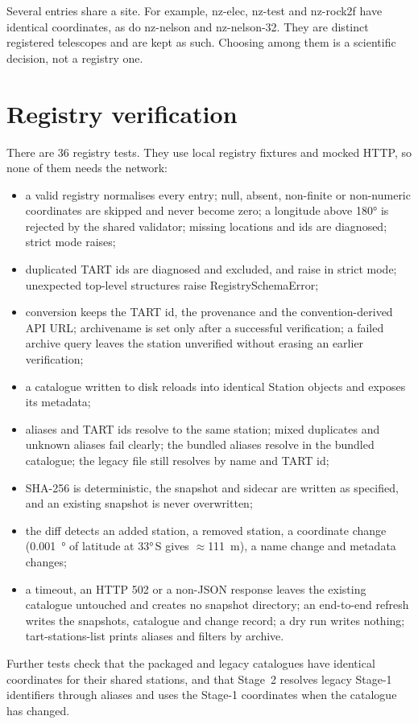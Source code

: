 \documentclass[11pt,a4paper]{article}
\newcommand{\code}[1]{{\ttfamily\def\_{\textunderscore\allowbreak}#1}}
\begin{document}
Several entries share a site. For example, \code{nz-elec}, \code{nz-test}
and \code{nz-rock2f} have identical coordinates, as do \code{nz-nelson} and
\code{nz-nelson-32}. They are distinct registered telescopes and are kept
as such. Choosing among them is a scientific decision, not a registry one.

\section{Registry verification}

There are 36 registry tests. They use local registry fixtures and mocked
HTTP, so none of them needs the network:
\begin{itemize}
\item a valid registry normalises every entry; \code{null}, absent,
non-finite or non-numeric coordinates are skipped and never become zero;
a longitude above \ang{180} is rejected by the shared validator; missing
locations and ids are diagnosed; strict mode raises;
\item duplicated TART ids are diagnosed and excluded, and raise in strict
mode; unexpected top-level structures raise \code{RegistrySchemaError};
\item conversion keeps the TART id, the provenance and the
convention-derived API URL; \code{archive\_name} is set only after a
successful verification; a failed archive query leaves the station
unverified without erasing an earlier verification;
\item a catalogue written to disk reloads into identical \code{Station}
objects and exposes its metadata;
\item aliases and TART ids resolve to the same station; mixed duplicates
and unknown aliases fail clearly; the bundled aliases resolve in the
bundled catalogue; the legacy file still resolves by name and TART id;
\item SHA-256 is deterministic, the snapshot and sidecar are written as
specified, and an existing snapshot is never overwritten;
\item the diff detects an added station, a removed station, a coordinate
change (\SI{0.001}{\degree} of latitude at \ang{33}\,S gives
$\approx$\SI{111}{\metre}), a name change and metadata changes;
\item a timeout, an HTTP 502 or a non-JSON response leaves the existing
catalogue untouched and creates no snapshot directory; an end-to-end
refresh writes the snapshots, catalogue and change record; a dry run writes
nothing; \code{tart-stations-list} prints aliases and filters by archive.
\end{itemize}
Further tests check that the packaged and legacy catalogues have identical
coordinates for their shared stations, and that Stage~2 resolves legacy
Stage-1 identifiers through aliases and uses the Stage-1 coordinates when
the catalogue has changed.
\end{document}
